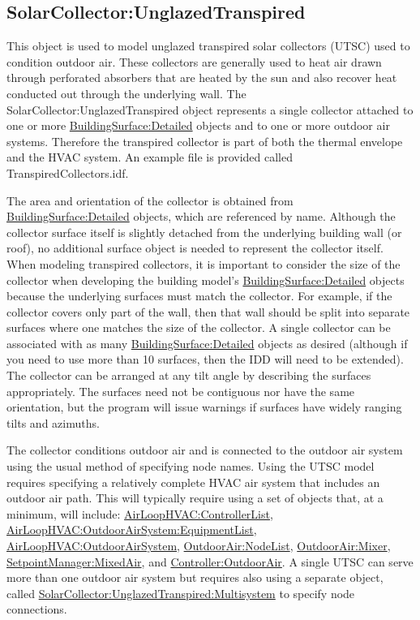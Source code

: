 \subsection{SolarCollector:UnglazedTranspired}\label{solarcollectorunglazedtranspired}

This object is used to model unglazed transpired solar collectors (UTSC) used to condition outdoor air. These collectors are generally used to heat air drawn through perforated absorbers that are heated by the sun and also recover heat conducted out through the underlying wall. The SolarCollector:UnglazedTranspired object represents a single collector attached to one or more \hyperref[buildingsurfacedetailed]{BuildingSurface:Detailed} objects and to one or more outdoor air systems. Therefore the transpired collector is part of both the thermal envelope and the HVAC system. An example file is provided called TranspiredCollectors.idf.

The area and orientation of the collector is obtained from \hyperref[buildingsurfacedetailed]{BuildingSurface:Detailed} objects, which are referenced by name. Although the collector surface itself is slightly detached from the underlying building wall (or roof), no additional surface object is needed to represent the collector itself. When modeling transpired collectors, it is important to consider the size of the collector when developing the building model's \hyperref[buildingsurfacedetailed]{BuildingSurface:Detailed} objects because the underlying surfaces must match the collector. For example, if the collector covers only part of the wall, then that wall should be split into separate surfaces where one matches the size of the collector. A single collector can be associated with as many \hyperref[buildingsurfacedetailed]{BuildingSurface:Detailed} objects as desired (although if you need to use more than 10 surfaces, then the IDD will need to be extended). The collector can be arranged at any tilt angle by describing the surfaces appropriately. The surfaces need not be contiguous nor have the same orientation, but the program will issue warnings if surfaces have widely ranging tilts and azimuths.

The collector conditions outdoor air and is connected to the outdoor air system using the usual method of specifying node names. Using the UTSC model requires specifying a relatively complete HVAC air system that includes an outdoor air path. This will typically require using a set of objects that, at a minimum, will include: \hyperref[airloophvaccontrollerlist]{AirLoopHVAC:ControllerList}, \hyperref[airloophvacoutdoorairsystemequipmentlist]{AirLoopHVAC:OutdoorAirSystem:EquipmentList}, \hyperref[airloophvacoutdoorairsystem]{AirLoopHVAC:OutdoorAirSystem}, \hyperref[outdoorairnodelist]{OutdoorAir:NodeList}, \hyperref[outdoorairmixer]{OutdoorAir:Mixer}, \hyperref[setpointmanagermixedair]{SetpointManager:MixedAir}, and \hyperref[controlleroutdoorair]{Controller:OutdoorAir}. A single UTSC can serve more than one outdoor air system but requires also using a separate object, called \hyperref[solarcollectorunglazedtranspiredmultisystem]{SolarCollector:UnglazedTranspired:Multisystem} to specify node connections.

